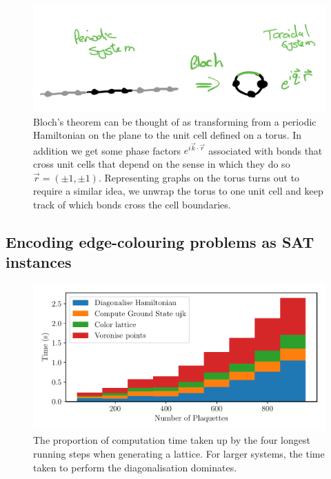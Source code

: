 \hypertarget{fig:bloch}{%
\begin{figure}
\centering
\includegraphics[width=1\textwidth,height=\textheight]{figure_code/amk_chapter/methods/bloch.png}
\caption[{Bloch's Theorem and the Torus}]{Bloch's theorem can be thought of as transforming from a periodic Hamiltonian on the plane to the unit cell defined on a torus. In addition we get some phase factors \(e^{i\vec{k}\cdot\vec{r}}\) associated with bonds that cross unit cells that depend on the sense in which they do so \(\vec{r} = (\pm1, \pm1)\). Representing graphs on the torus turns out to require a similar idea, we unwrap the torus to one unit cell and keep track of which bonds cross the cell boundaries.}
\label{fig:bloch}
\end{figure}
}

\hypertarget{encoding-edge-colouring-problems-as-sat-instances}{%
\subsection{Encoding edge-colouring problems as SAT instances}\label{encoding-edge-colouring-problems-as-sat-instances}}

\hypertarget{fig:times}{%
\begin{figure}
\centering
\includegraphics[width=1\textwidth,height=\textheight]{figure_code/amk_chapter/methods/times/times}
\caption[{Computation Time Spent on Different Procedures.}]{The proportion of computation time taken up by the four longest running steps when generating a lattice. For larger systems, the time taken to perform the diagonalisation dominates.}
\label{fig:times}
\end{figure}
}

